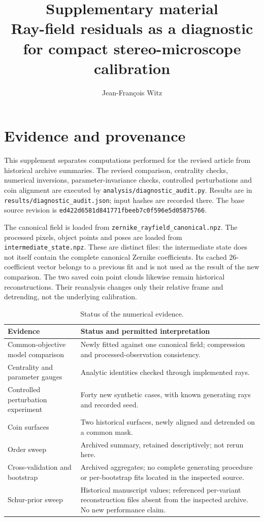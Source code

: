 \documentclass[10pt,a4paper]{article}
\title{Supplementary material\\\large Ray-field residuals as a diagnostic for compact stereo-microscope calibration}
\author{Jean-Fran\c{c}ois Witz}
\date{}
\begin{document}
\maketitle

\section{Evidence and provenance}
This supplement separates computations performed for the revised article from historical archive summaries. The revised comparison, centrality checks, numerical inversions, parameter-invariance checks, controlled perturbations and coin alignment are executed by \texttt{analysis/diagnostic\_audit.py}. Results are in \texttt{results/diagnostic\_audit.json}; input hashes are recorded there. The base source revision is \texttt{ed422d6581d841771fbeeb7c0f596e5d05875766}.

The canonical field is loaded from \texttt{zernike\_rayfield\_canonical.npz}. The processed pixels, object points and poses are loaded from \texttt{intermediate\_state.npz}. These are distinct files: the intermediate state does not itself contain the complete canonical Zernike coefficients. Its cached 26-coefficient vector belongs to a previous fit and is not used as the result of the new comparison. The two saved coin point clouds likewise remain historical reconstructions. Their reanalysis changes only their relative frame and detrending, not the underlying calibration.

\begin{table}[htbp]\centering\small
\caption{Status of the numerical evidence.}\label{tab:evidence}
\begin{tabular}{p{.37\linewidth}p{.54\linewidth}}\toprule
Evidence & Status and permitted interpretation\\\midrule
Common-objective model comparison & Newly fitted against one canonical field; compression and processed-observation consistency.\\
Centrality and parameter gauges & Analytic identities checked through implemented rays.\\
Controlled perturbation experiment & Forty new synthetic cases, with known generating rays and recorded seed.\\
Coin surfaces & Two historical surfaces, newly aligned and detrended on a common mask.\\
Order sweep & Archived summary, retained descriptively; not rerun here.\\
Cross-validation and bootstrap & Archived aggregates; no complete generating procedure or per-bootstrap fits located in the inspected source.\\
Schur-prior sweep & Historical manuscript values; referenced per-variant reconstruction files absent from the inspected archive. No new performance claim.\\\bottomrule
\end{tabular}
\end{table}
\end{document}
